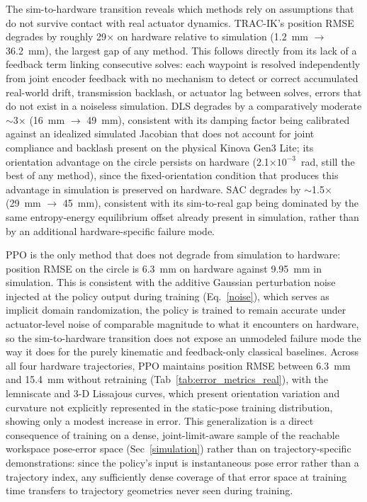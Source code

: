 \documentclass[preprint,12pt]{elsarticle}
\begin{document}
The sim-to-hardware transition reveals which methods rely on assumptions
that do not survive contact with real actuator dynamics. TRAC-IK's
position RMSE degrades by roughly 29$\times$ on hardware relative to
simulation (1.2~mm $\rightarrow$ 36.2~mm), the largest gap of any method.
This follows directly from its lack of a feedback term linking
consecutive solves: each waypoint is resolved independently from joint
encoder feedback with no mechanism to detect or correct accumulated
real-world drift, transmission backlash, or actuator lag between
solves, errors that do not exist in a noiseless simulation. DLS degrades
by a comparatively moderate $\sim$3$\times$ (16~mm $\rightarrow$ 49~mm),
consistent with its damping factor being calibrated against an idealized
simulated Jacobian that does not account for joint compliance and
backlash present on the physical Kinova Gen3 Lite; its orientation
advantage on the circle persists on hardware (2.1$\times10^{-3}$~rad,
still the best of any method), since the fixed-orientation condition that
produces this advantage in simulation is preserved on hardware. SAC
degrades by $\sim$1.5$\times$ (29~mm $\rightarrow$ 45~mm), consistent
with its sim-to-real gap being dominated by the same entropy-energy
equilibrium offset already present in simulation, rather than by an
additional hardware-specific failure mode.

PPO is the only method that does not degrade from simulation to
hardware: position RMSE on the circle is 6.3~mm on hardware against
9.95~mm in simulation. This is consistent with the additive Gaussian
perturbation noise injected at the policy output during training
(Eq.~\ref{noise}), which serves as implicit domain randomization, the policy is trained to remain accurate under actuator-level noise of comparable magnitude to what it encounters on hardware, so the sim-to-hardware transition does not expose an unmodeled failure mode the way it does for the purely kinematic and feedback-only classical baselines. Across all four hardware trajectories, PPO maintains position RMSE between 6.3~mm and 15.4~mm without retraining (Tab~\ref{tab:error_metrics_real}), with the lemniscate and 3-D Lissajous curves, which present orientation variation and curvature not
explicitly represented in the static-pose training distribution,
showing only a modest increase in error. This generalization is a direct
consequence of training on a dense, joint-limit-aware sample of the
reachable workspace pose-error space (Sec~\ref{simulation}) rather than on trajectory-specific demonstrations: since the policy's input is
instantaneous pose error rather than a trajectory index, any sufficiently
dense coverage of that error space at training time transfers to
trajectory geometries never seen during training.
\end{document}
